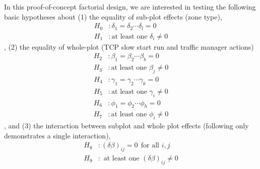 \documentclass{article}
\begin{document}
In this proof-of-concept factorial design, we are interested in testing the following basic hypotheses about (1) the equality of sub-plot effects (zone type), 
\begin{equation} \label{eq2}
\begin{split}
    H_0 & : \delta_1 = \delta_2 \cdots \delta_l = 0 \\
    H_1 & : \text{at least one } \delta_i \neq 0
\end{split}
\end{equation}
, (2) the equality of whole-plot (TCP slow start run and traffic manager actions)
\begin{equation} \label{eq3}
\begin{split}
    H_2 & : \beta_1 = \beta_2 \cdots \beta_b = 0 \\
    H_3 & : \text{at least one } \beta_j \neq 0
\end{split}
\end{equation}
\begin{equation} \label{eq4}
\begin{split}
    H_4 & : \gamma_1 = \gamma_2 \cdots \gamma_k = 0 \\
    H_5 & : \text{at least one } \gamma_i \neq 0
\end{split}
\end{equation}
\begin{equation} \label{eq5}
\begin{split}
    H_6 & : \phi_1 = \phi_2 \cdots \phi_h = 0 \\
    H_7 & : \text{at least one } \phi_i \neq 0
\end{split}
\end{equation}
, and (3) the interaction between subplot and whole plot effects (following only demonstrates a single interaction), 
\begin{equation} \label{eq6}
\begin{split}
    H_8 & : (\delta\beta)_{ij} = 0 \ \ \text{for all } i, j \\
    H_9 & : \text{ at least one } (\delta\beta)_{ij} \neq 0
\end{split}
\end{equation}

\end{document}
